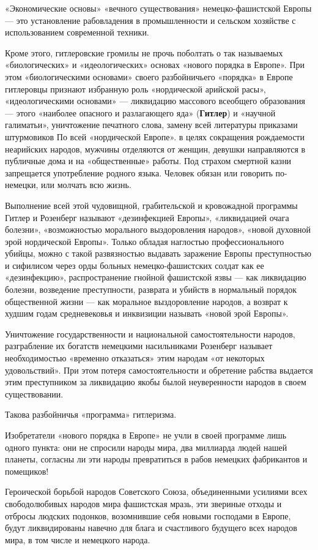 \documentclass[12pt, a4paper, openany]{book}
\begin{document}
«Экономические основы» «вечного существования» немецко-фашистской Европы — это установление рабовладения в промышленности и сельском хозяйстве с использованием современной техники.

Кроме этого, гитлеровские громилы не прочь поболтать о так называемых «биологических» и «идеологических» основах «нового порядка в Европе». При этом «биологическими основами» своего разбойничьего «порядка» в Европе гитлеровцы признают избранную роль «нордической арийской расы», «идеологическими основами» — ликвидацию массового всеобщего образования — этого «наиболее опасного и разлагающего яда» (\textbf{Гитлер}) и «научной галиматьи», уничтожение печатного слова, замену всей литературы приказами штурмовиков По всей «нордической Европе». в целях сокращения рождаемости неарийских народов, мужчины отделяются от женщин, девушки направляются в публичные дома и на «общественные» работы. Под страхом смертной казни запрещается употребление родного языка. Человек обязан или говорить по-немецки, или молчать всю жизнь.

Выполнение всей этой чудовищной, грабительской и кровожадной программы Гитлер и Розенберг называют «дезинфекцией Европы», «ликвидацией очага болезни», «возможностью морального выздоровления народов», «новой духовной эрой нордической Европы». Только обладая наглостью профессионального убийцы, можно с такой развязностью выдавать заражение Европы преступностью и сифилисом через орды больных немецко-фашистских солдат как ее «дезинфекцию», распространение гнойной фашистской язвы — как ликвидацию болезни, возведение преступности, разврата и убийств в нормальный порядок общественной жизни — как моральное выздоровление народов, а возврат к худшим годам средневековья и инквизиции называть «новой эрой Европы».

Уничтожение государственности и национальной самостоятельности народов, разграбление их богатств немецкими насильниками Розенберг называет необходимостью «временно отказаться» этим народам «от некоторых удовольствий». При этом потеря самостоятельности и обретение рабства выдается этим преступником за ликвидацию якобы былой неуверенности народов в своем существовании.

Такова разбойничья «программа» гитлеризма.

Изобретатели «нового порядка в Европе» не учли в своей программе лишь одного пункта: они не спросили народы мира, два миллиарда людей нашей планеты, согласны ли эти народы превратиться в рабов немецких фабрикантов и помещиков!

Героической борьбой народов Советского Союза, объединенными усилиями всех свободолюбивых народов мира фашистская мразь, эти звериные отходы и отбросы людских подонков, возомнившие себя новыми господами в Европе, будут ликвидированы навечно для блага и счастливого будущего всех народов мира, в том числе и немецкого народа.
\end{document}
